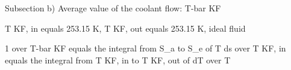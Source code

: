Subsection b) Average value of the coolant flow: T-bar KF

T KF, in equals 253.15 K, T KF, out equals 253.15 K, ideal fluid

1 over T-bar KF equals the integral from S_a to S_e of T ds over T KF, in equals the integral from T KF, in to T KF, out of dT over T